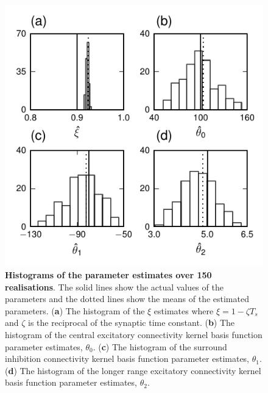 \documentclass[12pt]{iopart}
\begin{document}
\begin{figure}[!ht]
\begin{center}
\includegraphics{./Graph/pdf/Figure7.pdf}
\end{center}
\caption{{\bf Histograms of the parameter estimates over 150 realisations}. The solid lines show the actual values of the parameters and the dotted lines show the means of the estimated parameters. (\textbf{a}) The histogram of the $\xi$ estimates where $\xi=1-\zeta T_s $ and $\zeta$ is the reciprocal of the synaptic time constant. (\textbf{b}) The histogram of the central excitatory connectivity kernel basis function parameter estimates, $\theta_0$. (\textbf{c}) The histogram of the surround inhibition connectivity kernel basis function parameter estimates, $\theta_1$. (\textbf{d}) The histogram of the longer range excitatory connectivity kernel basis function parameter estimates, $\theta_2$.}
\label{fig:Figure7}
\end{figure}
\end{document}
